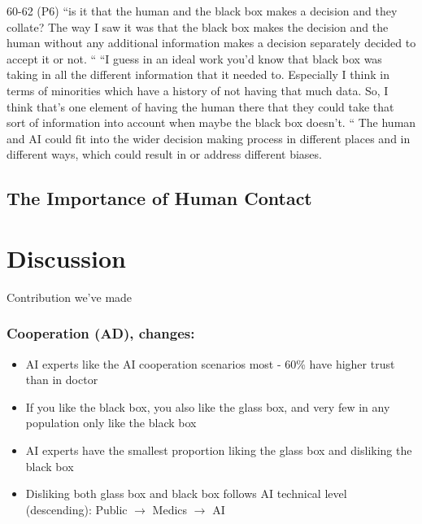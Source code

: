 \documentclass[manuscript,screen,review]{acmart}
\begin{document}
60-62 (P6)
“is it that the human and the black box makes a decision and they collate? The way I saw it was that the black box makes the decision and the human without any additional information makes a decision separately decided to accept it or not. “
“I guess in an ideal work you'd know that black box was taking in all the different information that it needed to. Especially I think in terms of minorities which have a history of not having that much data. So, I think that’s one element of having the human there that they could take that sort of information into account when maybe the black box doesn’t. “
The human and AI could fit into the wider decision making process in different places and in different ways, which could result in or address different biases.


\subsection{The Importance of Human Contact}


\section{Discussion}
Contribution we've made


\subsubsection{Cooperation (AD), changes:}
\begin{itemize}
    \item AI experts like the AI cooperation scenarios most - 60\% have higher trust than in doctor
    \item If you like the black box, you also like the glass box, and very few in any population only like the black box
    \item AI experts have the smallest proportion liking the glass box and disliking the black box
    \item Disliking both glass box and black box follows AI technical level (descending): Public $\rightarrow$ Medics $\rightarrow$ AI
\end{itemize}
\end{document}

